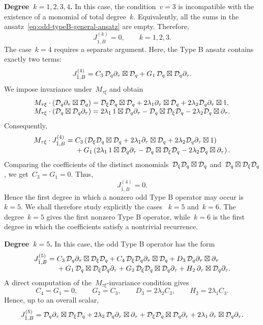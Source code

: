 \documentclass[12pt,a4paper]{amsart}
\theoremstyle{thm}
\theoremstyle{definition}
\newcommand {\Dq}{\cD_q}
\newcommand {\Dxi}{\cD_\xi}
\begin{document}
{\bf Degree~\(k=1,2,3,4\).} In this case, the condition~\(v=3\) is incompatible with the
existence of a monomial of total degree~\(k\). Equivalently, all
the sums in the ansatz~\eqref{eq:odd-typeB-general-ansatz} are empty. Therefore,
\[
J_{\bar1,B}^{(k)}=0,
\qquad
k=1,2,3.
\]
The case~\(k=4\) requires a separate argument. Here, the Type B ansatz
contains exactly two terms:
\[
J_{\bar1,B}^{(4)}
=
C_3\,\Dq\partial_\tau\boxtimes \Dq
+
G_1\,\Dq\boxtimes \Dq\partial_\tau.
\]
We impose invariance under~\(M_{\tau\xi}\) and obtain
\[
\begin{array}{r@{}l}
M_{\tau\xi}\cdot
\left(\Dq\partial_\tau\boxtimes \Dq\right)
={}&
\Dxi\Dq\boxtimes \Dq
+
2\lambda_1\partial_\tau\boxtimes \Dq
+
2\lambda_2\Dq\partial_\tau\boxtimes1,
\\
M_{\tau\xi}\cdot
\left(\Dq\boxtimes \Dq\partial_\tau\right)
={}&
2\lambda_1\,1\boxtimes \Dq\partial_\tau
-
\Dq\boxtimes \Dxi\Dq
-
2\lambda_2\Dq\boxtimes \partial_\tau.
\end{array}
\]
Consequently,
\[
\begin{array}{r@{}l}
M_{\tau\xi}\cdot J_{\bar1,B}^{(4)}
={}&
C_3
\left(
\Dxi\Dq\boxtimes \Dq
+
2\lambda_1\partial_\tau\boxtimes \Dq
+
2\lambda_2\Dq\partial_\tau\boxtimes1
\right)
\\
&{}+
G_1
\left(
2\lambda_1\,1\boxtimes \Dq\partial_\tau
-
\Dq\boxtimes \Dxi\Dq
-
2\lambda_2\Dq\boxtimes \partial_\tau
\right).
\end{array}
\]
Comparing the coefficients of the distinct monomials~$\Dxi\Dq\boxtimes\Dq$
and~$\Dq\boxtimes\Dxi\Dq$, we get~$C_3=G_1=0$. Thus,
\[
J_{\bar1,B}^{(4)}=0.
\]
Hence the first degree in which a nonzero odd Type B operator may
occur is~\(k=5\). We shall therefore study explicitly the cases~%
\(k=5\) and~\(k=6\). The degree~\(k=5\) gives the first nonzero Type B
operator, while~\(k=6\) is the first degree in which the coefficients
satisfy a nontrivial recurrence.

{\bf Degree~\(k=5\).} In this case, the odd Type B operator has the form
\[
\begin{array}{r@{}l}
J_{\bar1,B}^{(5)}
={}&
C_3\,\Dq\partial_\tau\boxtimes \Dxi\Dq
+
C_4\,\Dxi\Dq\partial_\tau\boxtimes \Dq
+
D_3\,\Dq\partial_\tau\boxtimes \partial_\tau
\\
&{}+
G_1\,\Dq\boxtimes \Dxi\Dq\partial_\tau
+
G_2\,\Dxi\Dq\boxtimes \Dq\partial_\tau
+
H_2\,\partial_\tau\boxtimes \Dq\partial_\tau.
\end{array}
\]
A direct computation of the~\(M_{\tau\xi}\)-invariance condition gives
\[
C_4=G_1=0,
\qquad
G_2=C_3,
\qquad
D_3=2\lambda_2C_3,
\qquad
H_2=2\lambda_1C_3.
\]
Hence, up to an overall scalar,
\[
J_{\bar1,B}^{(5)}
=
\Dq\partial_\tau\boxtimes \Dxi\Dq
+
2\lambda_2\,\Dq\partial_\tau\boxtimes \partial_\tau
+
\Dxi\Dq\boxtimes \Dq\partial_\tau
+
2\lambda_1\,\partial_\tau\boxtimes \Dq\partial_\tau.
\]
\end{document}
